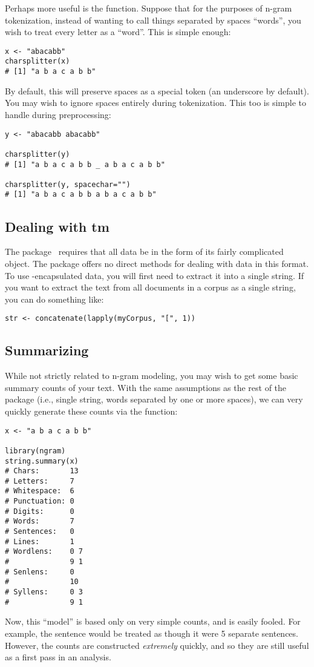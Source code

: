 Perhaps more useful is the  function.  Suppose that for the purposes of n-gram tokenization, instead of wanting to call things separated by spaces ``words'', you wish to treat every letter as a ``word''.  This is simple enough:
\begin{lstlisting}[language=rr]
x <- "abacabb"
charsplitter(x)
# [1] "a b a c a b b"
\end{lstlisting}
By default, this will preserve spaces as a special token (an underscore by default).  You may wish to ignore
spaces entirely during tokenization.  This too is simple to handle during preprocessing:
\begin{lstlisting}[language=rr]
y <- "abacabb abacabb"

charsplitter(y)
# [1] "a b a c a b b _ a b a c a b b"

charsplitter(y, spacechar="")
# [1] "a b a c a b b a b a c a b b"
\end{lstlisting}




\subsection{Dealing with tm}

The  package~\citep{tm} requires that all data be in the form of its fairly complicated  object.  The  package offers no direct methods for dealing with data in this format.  To use -encapsulated data, you will first need to extract it into a single string.
If you want to extract the text from all documents in a corpus as a single string, you can do something like:
\begin{lstlisting}[language=rr]
str <- concatenate(lapply(myCorpus, "[", 1))   
\end{lstlisting}




\subsection{Summarizing}

While not strictly related to n-gram modeling, you may wish to get some basic summary counts of your text.  With
the same assumptions as the rest of the  package (i.e., single string, words separated by one or more
spaces), we can very quickly generate these counts via the  function:
\begin{lstlisting}[language=rr]
x <- "a b a c a b b"
 
library(ngram)
string.summary(x)
# Chars:       13
# Letters:     7
# Whitespace:  6
# Punctuation: 0
# Digits:      0
# Words:       7
# Sentences:   0
# Lines:       1 
# Wordlens:    0 7 
#              9 1 
# Senlens:     0 
#              10 
# Syllens:     0 3 
#              9 1 
\end{lstlisting}
Now, this ``model'' is based only on very simple counts, and is easily fooled.  For example, the sentence   would be treated as though it were 5 separate sentences.  However, the counts are constructed \emph{extremely} quickly, and so they are still useful as a first pass in an analysis. 
